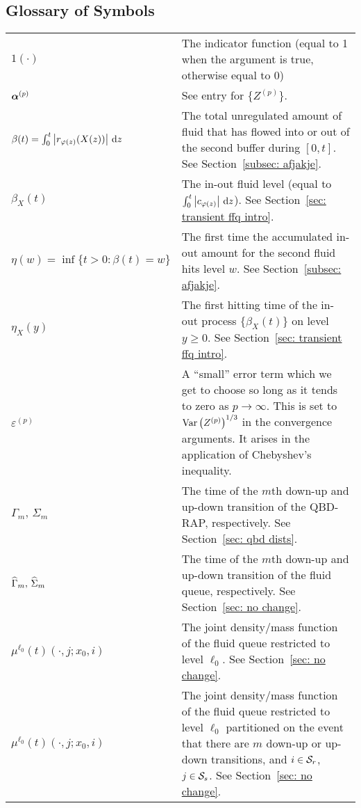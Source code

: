 \subsection*{Glossary of Symbols}
\begin{longtable}{p{}p{}}
  \(1(\cdot)\) 
      & The indicator function (equal to 1 when the argument is true, otherwise equal to 0) \\ 
   \(\boldsymbol\alpha^{(p)}\) 
      & See entry for \(\{Z^{(p)}\}\). \\
  \(\beta(t)= \int_0^t \left| r_{\varphi(z)}(X(z)) \right|  \, \mathrm{d} z \)
      & The total unregulated amount of fluid that has flowed into or out of the second buffer during $[0,t]$. See Section~\ref{subsec: afjakje}. \\
  \(\beta_X(t)\)
      & The in-out fluid level (equal to \(\int_0^t \left| c_{\varphi(z)} \right|  \, \mathrm{d} z\)). See Section~\ref{sec: transient ffq intro}. \\
  $\eta(w) = \inf \{t > 0: \beta(t) = w\}$ 
      & The first time the accumulated in-out amount for the second fluid hits level $w$. See Section~\ref{subsec: afjakje}. \\ 
  \(\eta_X(y)\) 
      & The first hitting time of the in-out process \(\{\beta_X(t)\}\) on level \(y\geq 0\). See Section~\ref{sec: transient ffq intro}. \\
  \(\varepsilon^{(p)}\) 
      & A ``small'' error term which we get to choose so long as it tends to zero as \(p\to\infty\). This is set to \(\mathrm{Var}\left(Z^{(p)}\right)^{1/3}\) in the convergence arguments. It arises in the application of Chebyshev's inequality. \\ 
  \(\Gamma_m,\, \Sigma_m\) 
      & The time of the \(m\)th down-up and up-down transition of the QBD-RAP, respectively. See Section~\ref{sec: qbd dists}. \\ 
  \(\widehat{\Gamma}_m,\, \widehat{\Sigma}_m\) 
      & The time of the \(m\)th down-up and up-down transition of the fluid queue, respectively. See Section~\ref{sec: no change}. \\ 
  \(\mu^{\ell_0}(t)(\cdot,j; x_0,i)\) 
      & The joint density/mass function of the fluid queue restricted to level \(\ell_0\). See Section~\ref{sec: no change}. \\
  \(\mu^{\ell_0}(t)(\cdot,j; x_0,i)\) 
      & The joint density/mass function of the fluid queue restricted to level \(\ell_0\) partitioned on the event that there are \(m\) down-up or up-down transitions, and \(i\in\mathcal{S}_r\), \(j\in\mathcal{S}_s\). See Section~\ref{sec: no change}. \\

\end{longtable}
